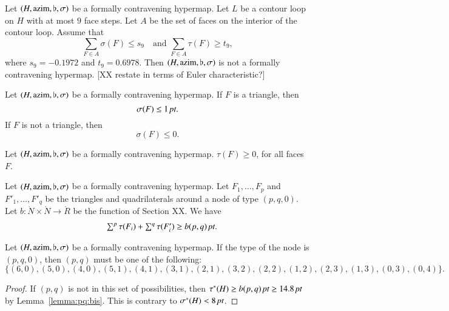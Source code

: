 \begin{lemma} \label{lemma:s9-t9:bis}
Let $(H,{\operatorname{azim}},\flat,\sigma)$ be a formally contravening hypermap.
Let $L$ be a contour loop on $H$ with at most $9$ face steps. Let
$A$ be the set of faces on the interior of the contour loop. Assume
that
    $$\sum_{F\in A}\sigma(F) \le s_9\quad\text{and }\sum_{F\in A}\tau(F)\ge t_9,$$
where $s_9=-0.1972$ and $t_9=0.6978$.  Then $(H,{\operatorname{azim}},\flat,\sigma)$
is not a formally contravening hypermap. [XX restate in terms of
Euler characteristic?]
\end{lemma}

\begin{lemma}  \label{lemma:0pt-1pt}
 Let $(H,{\operatorname{azim}},\flat,\sigma)$ be a formally contravening
hypermap. If $F$ is a triangle, then
    $$\sigma(F)\le1\,\hbox{\it pt}.$$
If $F$ is not a triangle, then
    $$\sigma(F)\le 0.$$
\end{lemma}

\begin{lemma}\label{lemma:roger0:bis}
 Let $(H,{\operatorname{azim}},\flat,\sigma)$ be a formally contravening
hypermap.
    $\tau(F)\ge 0$, for all faces $F$.
\end{lemma}




\begin{lemma} \label{lemma:pq:bis} %
 Let $(H,{\operatorname{azim}},\flat,\sigma)$ be a formally contravening
hypermap. Let $F_1,\ldots,F_p$ and $F'_1,\ldots,F'_q$ be the
triangles and quadrilaterals around a node of type $(p,q,0)$. Let
$b:\ring{N}\times\ring{N}\to\ring{R}$ be the function of Section XX.
We have
    $$
    \begin{array}{lll}
    &\sum^p\tau(F_i) + \sum^q\tau(F'_i) \ge b(p,q)\,\hbox{\it pt}.\\
    \end{array}
    $$
\end{lemma}

\begin{lemma}\label{lemma:pq-types:bis} %
Let $(H,{\operatorname{azim}},\flat,\sigma)$ be a formally contravening hypermap. If
the type of the node is $(p,q,0)$, then $(p,q)$ must be one of the
following:
    $$\{
        (6,0),(5,0),(4,0),
        (5,1),(4,1),(3,1),(2,1),
        (3,2),(2,2),(1,2),
        (2,3),(1,3),(0,3),(0,4)\}.$$
\end{lemma}

\begin{proof}  If $(p,q)$ is not in this set of possibilities, then
$\tau^*(H) \ge b(p,q)\,\hbox{\it pt} \ge 14.8\,\hbox{\it pt}$ by
Lemma~\ref{lemma:pq:bis}.  This is contrary to $\sigma^*(H) <
8\,\hbox{\it pt}$.
\end{proof}

